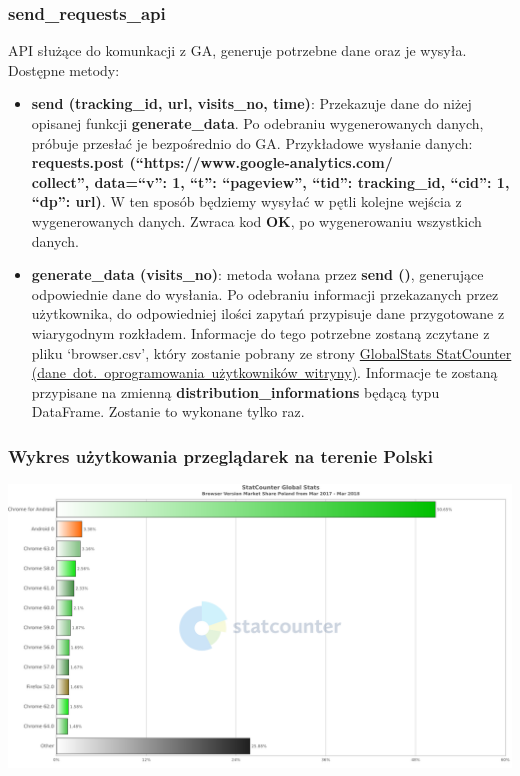 \documentclass{article}
\begin{document}
\subsubsection{send\_requests\_api}
API służące do komunkacji z GA, generuje potrzebne dane oraz je wysyła.
Dostępne metody:
\begin{itemize}
\item \textbf{send (tracking\_id, url, visits\_no, time)}: Przekazuje dane do niżej opisanej funkcji \textbf{generate\_data}. Po odebraniu wygenerowanych danych, próbuje przesłać je bezpośrednio do GA\@. Przykładowe wysłanie danych: \textbf{requests.post (``https://www.google-analytics.com/\\collect'', data={``v'':  1, ``t'': ``pageview'', ``tid'': tracking\_id, ``cid'': 1, ``dp'': url})}. W ten sposób będziemy wysyłać w pętli kolejne wejścia z wygenerowanych danych. Zwraca kod \textbf{OK}, po wygenerowaniu wszystkich danych.

\item \textbf{generate\_data (visits\_no)}: metoda wołana przez \textbf{send ()}, generujące odpowiednie dane do wysłania. Po odebraniu informacji przekazanych przez użytkownika, do odpowiedniej ilości zapytań przypisuje dane przygotowane z wiarygodnym rozkładem. Informacje do tego potrzebne zostaną zczytane z pliku `browser.csv', który zostanie pobrany ze strony \href{http://gs.statcounter.com/browser-version-market-share/all/poland#monthly-201703-201803-bar}{GlobalStats StatCounter (dane\ dot.\ oprogramowania\ użytkowników\ witryny)}. Informacje te zostaną przypisane na zmienną \textbf{distribution\_informations} będącą typu DataFrame. Zostanie to wykonane tylko raz.
\end{itemize}

\subsubsection{Wykres użytkowania przeglądarek na terenie Polski}
\begin{center}\includegraphics[scale=0.25]{chart}\end{center}
\end{document}
